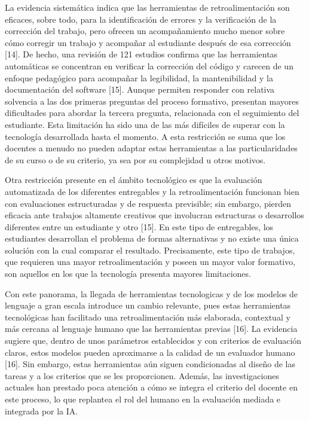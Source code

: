 \documentclass[letterpaper, 10 pt, conference]{ieeeconf}
\begin{document}
    La evidencia sistemática indica que las herramientas de retroalimentación son eficaces, sobre todo, para la identificación de errores y la verificación de la corrección del trabajo, pero ofrecen un acompañamiento mucho menor sobre cómo corregir un trabajo y acompañar al estudiante después de esa corrección [14]. De hecho, una revisión de 121 estudios confirma que las herramientas automáticas se concentran en verificar la corrección del código y carecen de un enfoque pedagógico para acompañar la legibilidad, la mantenibilidad y la documentación del software [15]. Aunque permiten responder con relativa solvencia a las dos primeras preguntas del proceso formativo, presentan mayores dificultades para abordar la tercera pregunta, relacionada con el seguimiento del estudiante. Esta limitación ha sido una de las más difíciles de superar con la tecnología desarrollada hasta el momento. A esta restricción se suma que los docentes a menudo no pueden adaptar estas herramientas a las particularidades de su curso o de su criterio, ya sea por su complejidad u otros motivos.

    Otra restricción presente en el ámbito tecnológico es que la evaluación automatizada de los diferentes entregables y la retroalimentación funcionan bien con evaluaciones estructuradas y de respuesta previsible; sin embargo, pierden eficacia ante trabajos altamente creativos que involucran estructuras o desarrollos diferentes entre un estudiante y otro [15]. En este tipo de entregables, los estudiantes desarrollan el problema de formas alternativas y no existe una única solución con la cual comparar el resultado. Precisamente, este tipo de trabajos, que requieren una mayor retroalimentación y poseen un mayor valor formativo, son aquellos en los que la tecnología presenta mayores limitaciones.

    Con este panorama, la llegada de herramientas tecnologicas y de los modelos de lenguaje a gran escala introduce un cambio relevante, pues estas herramientas tecnológicas han facilitado una retroalimentación más elaborada, contextual y más cercana al lenguaje humano que las herramientas previas [16]. La evidencia sugiere que, dentro de unos parámetros establecidos y con criterios de evaluación claros, estos modelos pueden aproximarse a la calidad de un evaluador humano [16]. Sin embargo, estas herramientas aún siguen condicionadas al diseño de las tareas y a los criterios que se les proporcionen. Además, las investigaciones actuales han prestado poca atención a cómo se integra el criterio del docente en este proceso, lo que replantea el rol del humano en la evaluación mediada e integrada por la IA.
\end{document}

